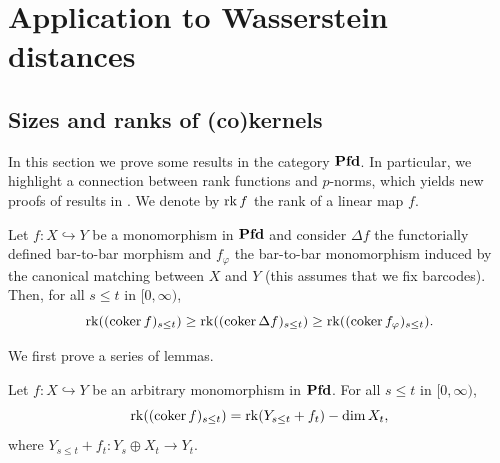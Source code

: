 \section{Application to Wasserstein distances}
\label{C!S:Wasserstein}

\subsection{Sizes and ranks of (co)kernels}
\label{C!SS:coker}

In this section we prove some results in the category $\operatorname{\mathbf{Pfd}}$. In particular, we highlight a connection between rank functions and $p$-norms, which yields new proofs of results in \cite[Section 3]{AGRS2025}. We denote by $\operatorname{rk} f$ the rank of a linear map $f$.

\begin{proposition}
\label{C!P:cokernel-rank}
  Let $f \colon X \hookrightarrow Y$ be a monomorphism in $\operatorname{\mathbf{Pfd}}$ and consider $\Delta f$ the functorially defined bar-to-bar morphism and $f_\varphi$ the bar-to-bar monomorphism induced by the canonical matching between $X$ and $Y$ (this assumes that we fix barcodes). Then, for all $s \leq t$ in $[0, \infty)$,
  \[
    \operatorname{rk}((\operatorname{coker} f)_{s \leq t}) \geq \operatorname{rk}((\operatorname{coker} \Delta f)_{s \leq t}) \geq \operatorname{rk}((\operatorname{coker} f_\varphi)_{s \leq t}).
  \]
\end{proposition}

We first prove a series of lemmas.

\begin{lemma}
\label{C!L:coker-rank-eq}
  Let $f \colon X \hookrightarrow Y$ be an arbitrary monomorphism in $\operatorname{\mathbf{Pfd}}$. For all $s \leq t$ in $[0, \infty)$,
  \[
    \operatorname{rk}((\operatorname{coker} f)_{s \leq t}) = \operatorname{rk}(Y_{s \leq t} + f_t) - \dim X_t,
  \]
  where $Y_{s \leq t} + f_t \colon Y_s \oplus X_t \to Y_t$.
\end{lemma}


